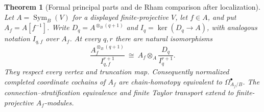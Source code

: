 \documentclass[11pt,a4paper]{article}
\numberwithin{algorithm}{section}
\numberwithin{equation}{section}
\newtheorem{theorem}{Theorem}[section]
\theoremstyle{definition}
\theoremstyle{remark}
\theoremstyle{plain}
\newcommand{\Sym}{\operatorname{Sym}}
\theoremstyle{definition}
\theoremstyle{plain}
\begin{document}
\begin{theorem}[Formal principal parts and de Rham comparison after localization]
\label{thm:localized-formal-derham}
Let $A=\Sym_B(V)$ for a displayed finite-projective $V$, let
$f\in A$, and put $A_f=A[f^{-1}]$.  Write $D_q=A^{\otimes_B(q+1)}$
and $I_q=\ker(D_q\to A)$, with analogous notation $I_{q,f}$
over $A_f$.  At every $q,r$ there are natural isomorphisms
\begin{equation}\label{eq:localized-higher-diagonals}
 \frac{A_f^{\otimes_B(q+1)}}{I_{q,f}^{r+1}}
 \ \cong\ A_f\otimes_A\frac{D_q}{I_q^{r+1}}.
\end{equation}
They respect every vertex and truncation map.  Consequently
normalized completed coordinate cochains of $A_f$ are
chain-homotopy equivalent to $\Omega^\bullet_{A_f/B}$.
The connection--stratification equivalence and finite Taylor
transport extend to finite-projective $A_f$-modules.
\end{theorem}
\end{document}
